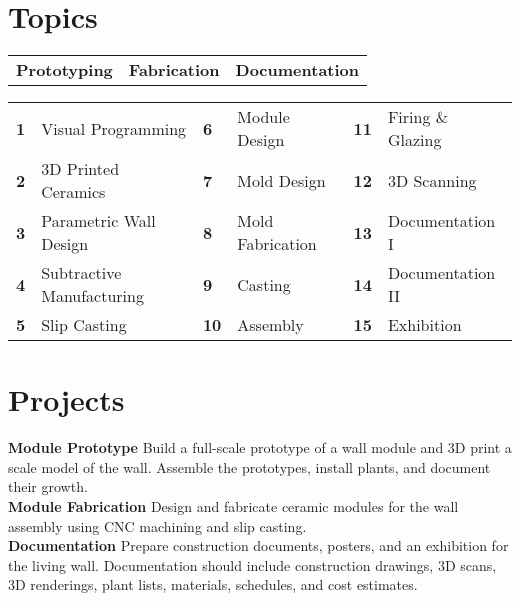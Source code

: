 \documentclass[11pt,article,oneside]{memoir}
\begin{document}
\section{Topics}
%
\begin{table}[H]
\begin{tabular}{l @{\hskip 3.5cm} l @{\hskip 2.2cm} l}
\textbf{Prototyping} & \textbf{Fabrication} & \textbf{Documentation}\\
\end{tabular}
\end{table}
%
\vspace*{-1em}
%
\begin{table}[H]
\begin{tabular}{l l l l l l}
\small
\textbf{1} & Visual Programming  & \textbf{6} & Module Design & \textbf{11} & Firing \& Glazing\\
\textbf{2} & 3D Printed Ceramics & \textbf{7} & Mold Design & \textbf{12} & 3D Scanning\\
\textbf{3} & Parametric Wall Design & \textbf{8} & Mold Fabrication & \textbf{13} & Documentation I\\
\textbf{4} & Subtractive Manufacturing & \textbf{9} & Casting & \textbf{14} & Documentation II\\
\textbf{5} & Slip Casting & \textbf{10} & Assembly & \textbf{15} & Exhibition\\
\end{tabular}
\end{table}

\clearpage


\section{Projects}

\noindent \textbf{Module Prototype}
Build a full-scale prototype of a wall module
and 3D print a scale model of the wall.
Assemble the prototypes, 
install plants, 
and document their growth.
\\

\noindent \textbf{Module Fabrication}
Design and fabricate ceramic modules for the wall assembly
using CNC machining and slip casting.
\\

\noindent \textbf{Documentation}
Prepare construction documents,
posters, and an exhibition for the living wall.
Documentation should include 
construction drawings, 3D scans, 3D renderings,
plant lists, materials, schedules, and cost estimates.
\\
\end{document}
